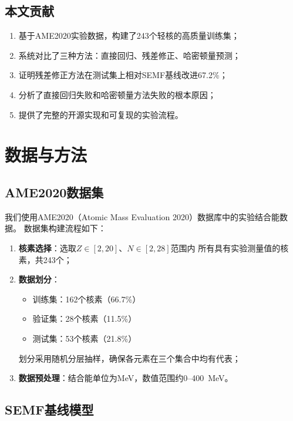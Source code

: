 \documentclass[12pt, a4paper]{article}
\begin{document}
\subsection{本文贡献}

\begin{enumerate}
  \item 基于AME2020实验数据，构建了243个轻核的高质量训练集；
  \item 系统对比了三种方法：直接回归、残差修正、哈密顿量预测；
  \item 证明残差修正方法在测试集上相对SEMF基线改进67.2\%；
  \item 分析了直接回归失败和哈密顿量方法失败的根本原因；
  \item 提供了完整的开源实现和可复现的实验流程。
\end{enumerate}

\section{数据与方法}
\label{sec:method}

\subsection{AME2020数据集}

我们使用AME2020（Atomic Mass Evaluation 2020）\cite{wang2021ame}数据库中的实验结合能数据。
数据集构建流程如下：

\begin{enumerate}
  \item \textbf{核素选择}：选取$Z \in [2, 20]$、$N \in [2, 28]$范围内
        所有具有实验测量值的核素，共243个；
  \item \textbf{数据划分}：
        \begin{itemize}
          \item 训练集：162个核素（66.7\%）
          \item 验证集：28个核素（11.5\%）
          \item 测试集：53个核素（21.8\%）
        \end{itemize}
        划分采用随机分层抽样，确保各元素在三个集合中均有代表；
  \item \textbf{数据预处理}：结合能单位为MeV，数值范围约0--400~MeV。
\end{enumerate}

\subsection{SEMF基线模型}
\end{document}
